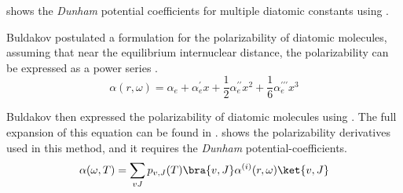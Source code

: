      shows the \textit{Dunham} potential
    coefficients for multiple diatomic constants using
    .
    \begin{table}[H]
            \caption{Potential \textit{Dunham} coefficients,
            }\label{tab:potentialDunhamCoefficients}
    \end{table}

    Buldakov \cite{Buldakov2000} postulated a formulation for
    the polarizability of diatomic molecules, assuming that near the
    equilibrium internuclear distance, the polarizability can be expressed as a
    power series .
    \begin{equation}\label{eq:buldakovPowerSeriesPolarizability}
        \alpha(r,\omega) = \alpha_e + \alpha_e^{\prime}x +
            \frac{1}{2}\alpha_e^{\prime\prime}x^2 +
            \frac{1}{6}\alpha_e^{\prime\prime\prime}x^3
    \end{equation}

    Buldakov then expressed the polarizability of diatomic molecules using
    . The full expansion of this
    equation can be found in .
     shows the polarizability derivatives
    used in this method, and it requires the \textit{Dunham}
    potential-coefficients.
    \begin{equation}\label{eq:buldakovPolarizabilityDistance}
        \alpha(\omega, T) = \sum_{vJ} p_{v,J}(T)
        \bra{v,J}\alpha^{(i)}(r,\omega)\ket{v,J}
    \end{equation}

